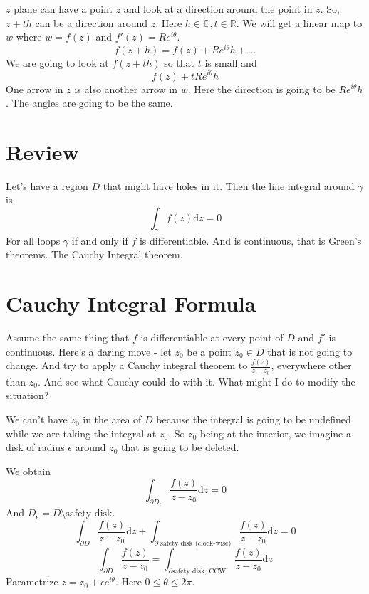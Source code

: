 \documentclass[letter]{article}
\title{}
\author{Ahmed Saad Sabit, Rice University}
\date{\today}
\begin{document}
\maketitle
$z$ plane can have a point $z$ and look at a direction around the point in $z$. So, $z + th$ can be a direction around $z$. Here $h \in \mathbb{C}, t \in \mathbb{R}$. We will get a linear map to $w$ where $w = f(z)$ and $f'(z) = Re^{i\theta}$.
\[
f(z+h) = f(z) + R e^{i\theta}h + \ldots
\]
We are going to look at $f(z+th)$ so that $t$ is small and 
\[
f(z) + t R e^{i\theta} h
\]
One arrow in $z$ is also another arrow in $w$. Here the direction is going to be $R e^{i\theta}h$. The angles are going to be the same. 

\section{Review}
Let's have a region $D$ that might have holes in it. Then the line integral around $\gamma$ is 
\[
\int_\gamma f(z) \mathrm{d} z = 0
\] For all loops $\gamma$ if and only if $f$ is differentiable. And is continuous, that is Green's theorems. The  Cauchy Integral theorem.

\section{Cauchy Integral Formula} 
Assume the same thing that $f$ is differentiable at every point of $D$ and $f'$ is continuous. Here's a daring move - let $z_0$ be a point $z_0 \in D$ that is not going to change. And try to apply a Cauchy integral theorem to $\frac{f(z)}{z-z_0}$, everywhere other than $z_0$. And see what Cauchy could do with it. What might I do to modify the situation? 

We can't have $z_0$ in the area of $D$ because the integral is going to be undefined while we are taking the integral at $z_0$. So $z_0$ being at the interior, we imagine a disk of radius $\epsilon$ around $z_0$ that is going to be deleted.

We obtain 
\[
	\int_{\partial D_\epsilon} \frac{f(z)}{z-z_0}\mathrm{d} z = 0
\]
And $D_{\epsilon} = D \setminus \text{safety disk}$. 
\[
	\int_{\partial D} \frac{f(z)}{z-z_0} \mathrm{d} z + 
	\int_{\partial \text{ safety disk (clock-wise)}} \frac{f(z)}{z-z_0} \mathrm{d} z = 0
\] 
\[
	\int_{\partial D} \frac{f(z)}{z-z_0} = \int_{\partial \text{safety disk, CCW}} \frac{f(z)}{z-z_0} \mathrm{d} z
\] 
Parametrize $z = z_0 + \epsilon e^{i \theta}$. Here $0 \le \theta \le 2\pi $. 
\end{document}
